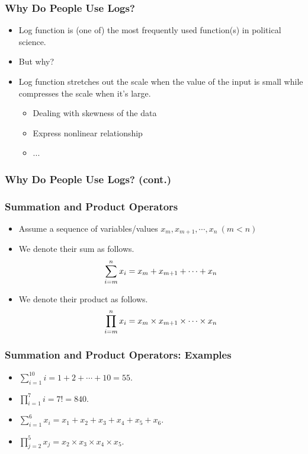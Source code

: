 \documentclass[pdflatex, 12pt]{beamer}
\begin{document}
\begin{frame}
\frametitle{Why Do People Use Logs?}
\begin{itemize}
\item Log function is (one of) the most frequently used function(s) in political science.
\vspace{0.4cm}
\item But why?
\vspace{0.4cm}
\item Log function stretches out the scale when the value of the input is small while compresses the scale when it's large.
 \begin{itemize}
 \item Dealing with skewness of the data
 \item Express nonlinear relationship
 \item ...
 \end{itemize}
\end{itemize}
\end{frame}

\begin{frame}
\frametitle{Why Do People Use Logs? (cont.)}
\centering
{}
\end{frame}

\begin{frame}
\frametitle{Summation and Product Operators}
\begin{itemize}
\item Assume a sequence of variables/values $x_m, x_{m + 1}, \cdots, x_n \ (m < n)$
\vspace{0.4cm}
\item We denote their sum as follows.
 \begin{equation}
 \sum_{i = m}^{n} x_i = x_m + x_{m + 1} + \cdots + x_n \notag
 \end{equation}
\item We denote their product as follows.
 \begin{equation}
 \prod_{i = m}^{n} x_i = x_m \times x_{m + 1} \times \cdots \times x_n \notag 
 \end{equation}
\end{itemize}
\end{frame}

\begin{frame}
\frametitle{Summation and Product Operators: Examples}
\begin{itemize}
\item $\sum_{i = 1}^{10} i = 1 + 2 + \cdots + 10 = 55.$
\vspace{0.4cm}
\item $\prod_{i = 1}^{7} i = 7! = 840.$
\vspace{0.4cm}
\item $\sum_{i = 1}^{6} x_i = x_1 + x_2 + x_3 + x_4 + x_5 + x_6.$
\vspace{0.4cm}
\item $\prod_{j = 2}^{5} x_j = x_2 \times x_3 \times x_4 \times x_5.$
\end{itemize}
\end{frame}
\end{document}
